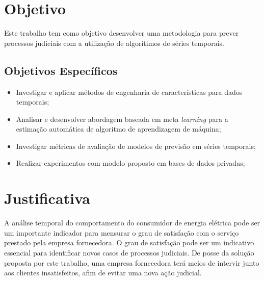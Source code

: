 \documentclass[../main.tex]{subfiles}
\begin{document}
\section{Objetivo}

Este trabalho tem como objetivo desenvolver uma metodologia para prever processos judiciais com a utilização de algorítimos de séries temporais.
\subsection{Objetivos Específicos}
\begin{itemize}
    \item Investigar e aplicar métodos de engenharia de características para dados temporais;
	\item Analisar e desenvolver abordagem baseada em meta \textit{learning} para a estimação automática de algoritmo de aprendizagem de máquina;
	\item Investigar métricas de avaliação de modelos de previsão em séries temporais;
	\item Realizar experimentos com modelo proposto em bases de dados privadas;
\end{itemize}

\section{Justificativa}

A análise temporal do comportamento do consumidor de energia elétrica pode ser um importante indicador para mensurar o grau de satisfação com o serviço prestado pela empresa fornecedora. O grau de satisfação pode ser um indicativo essencial para identificar novos casos de processos judiciais. De posse da solução proposta por este trabalho, uma empresa fornecedora terá meios de intervir junto aos clientes insatisfeitos, afim de evitar uma nova ação judicial.
\end{document}

